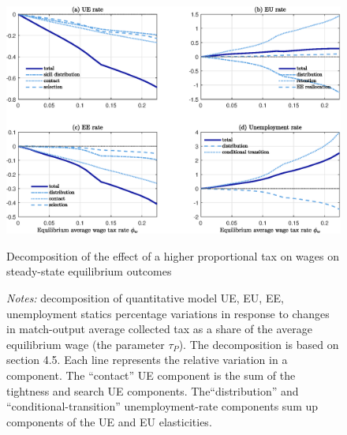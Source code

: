 \documentclass[12pt]{article} %
\theoremstyle{plain}
\theoremstyle{definition}
\begin{document}
	\begin{figure}[!h]
		\centering
		\includegraphics[width = 6.5in]{Figure_7.eps} 
		\caption{Decomposition of the effect of a higher proportional tax on wages on steady-state equilibrium outcomes}
		\label{fig:fig_8}
		\caption*{\footnotesize{\textit{Notes:} decomposition of quantitative model UE, EU, EE, unemployment statics percentage variations in response to changes in match-output average collected tax as a share of the average equilibrium wage (the parameter $\tau_P$). The decomposition is based on section 4.5. Each line represents the relative variation in a component. The ``contact'' UE component is the sum of the tightness and search UE components. The``distribution'' and ``conditional-transition'' unemployment-rate components sum up components of the UE and EU elasticities.}}
	\end{figure}
	
\end{document}
